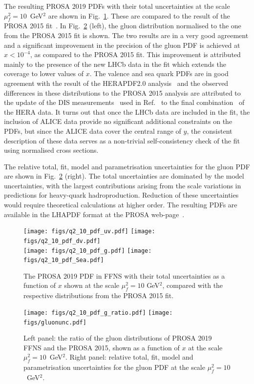 The resulting PROSA 2019 PDFs with their total uncertainties at the scale $\mu^2_f=10$~GeV$^2$ are shown in Fig.~\ref{fig:pdfs}. These are compared to the result of the PROSA 2015 fit~\cite{Zenaiev:2015rfa}. In Fig.~\ref{fig:pdfratios} (left), the gluon distribution 
normalised to the one from the PROSA 2015 fit is shown. The two results are in a very good agreement and a significant improvement 
in the precision of the gluon PDF is achieved at $x < 10^{-4}$, as compared to the PROSA 2015 fit. 
{\color{blue}This improvement is attributed mainly to the presence of the new LHCb data in the fit which extends the coverage to lower values of $x$.} 
The valence and sea quark PDFs are in good agreement with the result of the HERAPDF2.0 analysis~\cite{Abramowicz:2015mha} and the 
observed differences in these distributions to the PROSA 2015 analysis are attributed to the update of the DIS measurements~\cite{Aaron:2009aa} used in Ref.~\cite{Zenaiev:2015rfa} to the final combination~\cite{Abramowicz:2015mha} of the HERA data.
{\color{blue}It turns out that once the LHCb data are included in the fit, the inclusion of ALICE data provide no significant additional constraints on the PDFs, but since the ALICE data cover the central range of $y$, the consistent description of these data serves as a non-trivial self-consistency check of the fit using normalised cross sections.}

The relative total, fit, model and parametrisation uncertainties for the gluon PDF are shown in Fig.~\ref{fig:pdfratios} (right). 
The total uncertainties are dominated by the model uncertainties, with the largest contributions arising from the scale 
variations in predictions for heavy-quark hadroproduction. Reduction of these uncertainties would require theoretical calculations at higher order.  The resulting PDFs are available in the LHAPDF format at the PROSA web-page~\cite{prosaweb}.

\begin{figure}
    \centering
    \texttt{[image: figs/q2\_10\_pdf\_uv.pdf]}
    \texttt{[image: figs/q2\_10\_pdf\_dv.pdf]}\\
    \texttt{[image: figs/q2\_10\_pdf\_g.pdf]}
    \texttt{[image: figs/q2\_10\_pdf\_Sea.pdf]}
    \caption{The PROSA 2019 PDF in FFNS with their total uncertainties as a function of $x$ shown at the scale $\mu^2_f=10$ GeV$^2$, compared with the respective distributions from the PROSA 2015 fit.}
    \label{fig:pdfs}
\end{figure}

\begin{figure}
    \centering
    \texttt{[image: figs/q2\_10\_pdf\_g\_ratio.pdf]}
    \texttt{[image: figs/gluonunc.pdf]}
    \caption{Left panel: the ratio of the gluon distributions of PROSA 2019 FFNS and the PROSA 2015, shown as a function of $x$ at the scale $\mu^2_f=10$~GeV$^2$. Right panel: relative total, fit, model and parametrisation uncertainties for the gluon PDF at the scale $\mu^2_f=10$~GeV$^2$.}
    \label{fig:pdfratios}
\end{figure}


